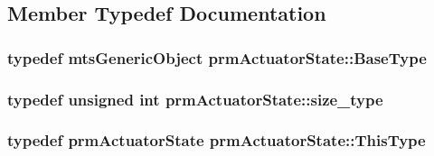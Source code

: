 \subsection{Member Typedef Documentation}
\hypertarget{classprm_actuator_state_abdc6ad9216ba3ef6720153feeadee054}{
\subsubsection[{Base\-Type}]{\setlength{\rightskip}{0pt plus 5cm}typedef {\bf mts\-Generic\-Object} {\bf prm\-Actuator\-State\-::\-Base\-Type}}}\label{classprm_actuator_state_abdc6ad9216ba3ef6720153feeadee054}
\hypertarget{classprm_actuator_state_a1ed9ac69482dab8ddf628b1858c42631}{
\subsubsection[{size\-\_\-type}]{\setlength{\rightskip}{0pt plus 5cm}typedef unsigned int {\bf prm\-Actuator\-State\-::size\-\_\-type}}}\label{classprm_actuator_state_a1ed9ac69482dab8ddf628b1858c42631}
\hypertarget{classprm_actuator_state_ac269257fa02fea72e3a2d55526f9a627}{
\subsubsection[{This\-Type}]{\setlength{\rightskip}{0pt plus 5cm}typedef {\bf prm\-Actuator\-State} {\bf prm\-Actuator\-State\-::\-This\-Type}}}\label{classprm_actuator_state_ac269257fa02fea72e3a2d55526f9a627}



